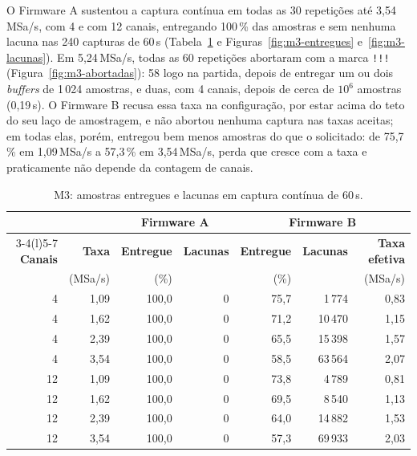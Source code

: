 O Firmware A sustentou a captura contínua em todas as 30 repetições até
3,54\,MSa/s, com 4 e com 12 canais, entregando 100\,\% das amostras e sem
nenhuma lacuna nas 240 capturas de 60\,s (Tabela~\ref{tab:m3-resumo} e
Figuras~\ref{fig:m3-entregues} e~\ref{fig:m3-lacunas}). Em 5,24\,MSa/s,
todas as 60 repetições abortaram com a marca \texttt{!!!}
(Figura~\ref{fig:m3-abortadas}): 58 logo na partida, depois de entregar um ou
dois \emph{buffers} de 1\,024 amostras, e duas, com 4 canais, depois de
cerca de $10^6$ amostras (0,19\,s). O Firmware B recusa essa taxa na
configuração, por estar acima do teto do seu laço de amostragem, e não
abortou nenhuma captura nas taxas aceitas; em todas elas, porém, entregou
bem menos amostras do que o solicitado: de 75,7\,\% em 1,09\,MSa/s a
57,3\,\% em 3,54\,MSa/s, perda que cresce com a taxa e praticamente não
depende da contagem de canais.

\begin{table}[H]
  \centering
  \caption{M3: amostras entregues e lacunas em captura contínua de 60\,s.}
  \label{tab:m3-resumo}
  \begin{tabular}{@{}rrrrrrr@{}}
    \toprule
    & & \multicolumn{2}{c}{\textbf{Firmware A}} &
    \multicolumn{3}{c}{\textbf{Firmware B}} \\
    \cmidrule(lr){3-4}\cmidrule(l){5-7}
    \textbf{Canais} & \textbf{Taxa} & \textbf{Entregue} & \textbf{Lacunas} &
    \textbf{Entregue} & \textbf{Lacunas} & \textbf{Taxa efetiva} \\
    & (MSa/s) & (\%) & & (\%) & & (MSa/s) \\
    \midrule
    4  & 1,09 & 100,0 & 0 & 75,7 &  1\,774 & 0,83 \\
    4  & 1,62 & 100,0 & 0 & 71,2 & 10\,470 & 1,15 \\
    4  & 2,39 & 100,0 & 0 & 65,5 & 15\,398 & 1,57 \\
    4  & 3,54 & 100,0 & 0 & 58,5 & 63\,564 & 2,07 \\
    12 & 1,09 & 100,0 & 0 & 73,8 &  4\,789 & 0,81 \\
    12 & 1,62 & 100,0 & 0 & 69,5 &  8\,540 & 1,13 \\
    12 & 2,39 & 100,0 & 0 & 64,0 & 14\,882 & 1,53 \\
    12 & 3,54 & 100,0 & 0 & 57,3 & 69\,933 & 2,03 \\
    \bottomrule
  \end{tabular}
\end{table}

